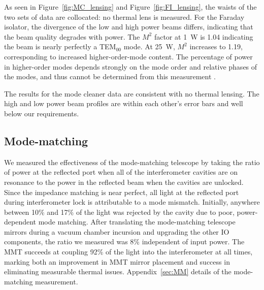 As seen in Figure~\ref{fig:MC_lensing} and Figure~\ref{fig:FI_lensing}, the
waists of the two sets of data are collocated: no thermal lens is
measured. For the Faraday isolator, the divergence of the low and high
power beams differs, indicating that the beam quality degrades with
power. The $M^2$ factor at 1~W is 1.04 indicating the beam is 
nearly perfectly a TEM$_{00}$ mode. At 25~W, $M^2$ increases to 1.19,
corresponding to increased higher-order-mode content. The percentage
of power in higher-order modes depends strongly on the mode order and
relative phases of the modes, and thus cannot be determined from this
measurement \citep{Kwee2007Laser}.

The results for the mode cleaner data are consistent with no thermal
lensing. The high and low power beam profiles are within each
other's error bars and well below our requirements. 




\subsection{Mode-matching}
We measured the effectiveness of the mode-matching telescope by taking
the ratio of power at the reflected port when all of the
interferometer cavities are on resonance to the power in the reflected
beam when the cavities are unlocked. Since the impedance matching is
near perfect, all light at the reflected port during interferometer
lock is attributable to a mode mismatch. Initially, anywhere
between 10\% and 17\% of the light was rejected by the cavity due to
poor, power-dependent mode matching.  After translating the
mode-matching telescope mirrors during a vacuum chamber incursion and
upgrading the other IO components, the ratio we measured was 8\%
independent of input power. The MMT succeeds at coupling 92\% of the
light into the interferometer at all times, marking both an
improvement in MMT mirror placement and success in eliminating
measurable thermal issues. Appendix~\ref{sec:MM} details of the
mode-matching measurement.


